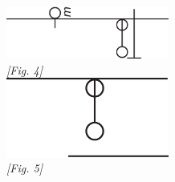 \begin{center}
   \vspace{10mm}
  \includegraphics[width=0.4\textwidth]{images/38_87r4}
  \vspace{0.5ex}
   \\\textit{[Fig. 4]} \\
   \vspace{10mm}
  \includegraphics[width=0.4\textwidth]{images/38_87r5}
   \\\textit{[Fig. 5]}
 \end{center}